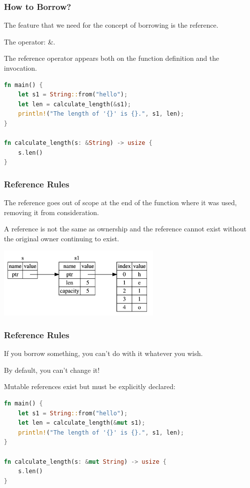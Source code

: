 \begin{frame}[fragile]
\frametitle{How to Borrow?}

The feature that we need for the concept of borrowing is the \alert{reference}.

The operator: \alert{\&}.

The reference operator appears both on the function definition and the invocation.

\begin{lstlisting}[language=Rust]
fn main() {
    let s1 = String::from("hello");
    let len = calculate_length(&s1);
    println!("The length of '{}' is {}.", s1, len);
}

fn calculate_length(s: &String) -> usize {
    s.len()
}
\end{lstlisting}

\end{frame}


\begin{frame}
\frametitle{Reference Rules}

The reference goes out of scope at the end of the function where it was used, removing it from consideration. 

A reference is not the same as ownership and the reference cannot exist without the original owner continuing to exist. 

\begin{center}
\includegraphics[width=0.6\textwidth]{images/string-with-ref.png}
\end{center}

\end{frame}


\begin{frame}[fragile]
\frametitle{Reference Rules}

If you borrow something, you can't do with it whatever you wish.

By default, you can't change it! 

Mutable references exist but must be explicitly declared:

\begin{lstlisting}[language=Rust]
fn main() {
    let s1 = String::from("hello");
    let len = calculate_length(&mut s1);
    println!("The length of '{}' is {}.", s1, len);
}

fn calculate_length(s: &mut String) -> usize {
    s.len()
}
\end{lstlisting}


\end{frame}


